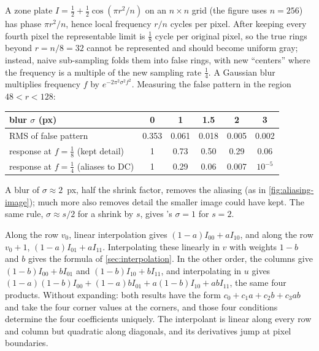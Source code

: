 \begin{solutions}
  \item A zone plate $I = \tfrac12 + \tfrac12\cos(\pi r^2/n)$ on an $n\times n$ grid (the figure uses $n = 256$) has phase $\pi r^2/n$, hence local frequency $r/n$ cycles per pixel. After
        keeping every fourth pixel the representable limit is $\tfrac18$ cycle per original pixel, so the true rings beyond $r = n/8 = 32$ cannot be represented
        and should become uniform gray; instead, naive sub-sampling folds them into false rings, with new ``centers'' where the frequency is a multiple of the
        new sampling rate $\tfrac14$. A Gaussian blur multiplies frequency $f$ by $e^{-2\pi^2\sigma^2f^2}$. Measuring the false pattern in the region $48 < r < 128$:
        \begin{center}\small
        \begin{tabular}{@{}l c c c c c@{}}
        \toprule
        blur $\sigma$ (px) & 0 & 1 & 1.5 & 2 & 3 \\
        \midrule
        RMS of false pattern & 0.353 & 0.061 & 0.018 & 0.005 & 0.002 \\
        response at $f = \tfrac18$ (kept detail) & 1 & 0.73 & 0.50 & 0.29 & 0.06 \\
        response at $f = \tfrac14$ (aliases to DC) & 1 & 0.29 & 0.06 & 0.007 & $10^{-5}$ \\
        \bottomrule
        \end{tabular}
        \end{center}
        A blur of $\sigma \approx 2$~px, half the shrink factor, removes the aliasing (as in \cref{fig:aliasing-image}); much more also removes detail the smaller image could
        have kept. The same rule, $\sigma \approx s/2$ for a shrink by $s$, gives 's $\sigma = 1$ for $s = 2$.

  \item Along the row $v_0$, linear interpolation gives $(1 - a)I_{00} + aI_{10}$, and along the row $v_0 + 1$, $(1 - a)I_{01} + aI_{11}$. Interpolating these linearly in $v$ with
        weights $1 - b$ and $b$ gives the formula of \cref{sec:interpolation}. In the other order, the columns give $(1 - b)I_{00} + bI_{01}$ and $(1 - b)I_{10} + bI_{11}$, and
        interpolating in $u$ gives $(1 - a)(1 - b)I_{00} + (1 - a)bI_{01} + a(1 - b)I_{10} + abI_{11}$, the same four products. Without expanding: both results have the form
        $c_0 + c_1a + c_2b + c_3ab$ and take the four corner values at the corners, and those four conditions determine the four coefficients uniquely. The
        interpolant is linear along every row and column but quadratic along diagonals, and its derivatives jump at pixel boundaries.


\end{solutions}
